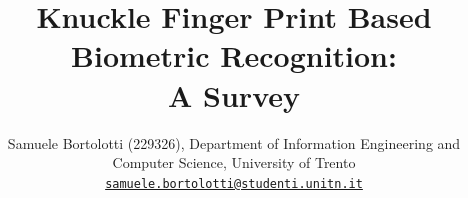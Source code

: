 \documentclass[journal]{IEEEtran}
\begin{document}
%
\title{Knuckle Finger Print Based Biometric Recognition:\\A Survey}
%
%
%

\author{Samuele Bortolotti (229326), Department of Information Engineering and Computer Science, University of Trento\\
\href{mailto:samuele.bortolotti@studenti.unitn.it}{\texttt{samuele.bortolotti@studenti.unitn.it}} }%



% 
%
\end{document}

